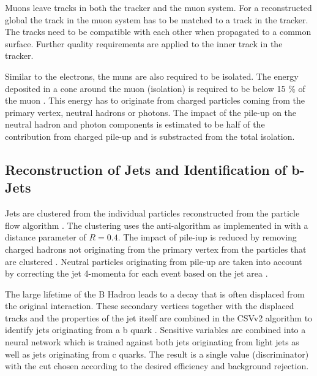 Muons leave tracks in both the tracker and the muon system. For a reconstructed global the track in the muon system has to be matched to a track in the tracker.
The tracks need to be compatible with each other when propagated to a common surface.
Further quality requirements are applied to the inner track in the tracker.

Similar to the electrons, the muns are also required to be isolated. The energy deposited in a cone around the muon (isolation) is required to be below 15 \% of the muon \pt.
This energy has to originate from charged particles coming from the primary vertex, neutral hadrons or photons. The impact of the pile-up on the neutral hadron and photon components
is estimated to be half of the contribution from charged pile-up and is substracted from the total isolation.



\subsection{Reconstruction of Jets and Identification of b-Jets}

Jets are clustered from the individual particles reconstructed from the particle flow algorithm \cite{CMS-PAS-JME-16-003}.
The clustering uses the anti-\kt algorithm \cite{Cacciari:2008gp} as implemented in \FASTJET \cite{Cacciari:2011ma} with a distance parameter of $R = 0.4$.
The impact of pile-iup is reduced by removing charged hadrons not originating from the primary vertex from the particles that are clustered \cite{CMS-PAS-JME-14-001}.
Neutral particles originating from pile-up are taken into account by correcting the jet 4-momenta for each event based on the jet area \cite{1126-6708-2008-04-005,CACCIARI2008119}.

The large lifetime of the B Hadron leads to a decay that is often displaced from the original interaction.
These secondary vertices together with the displaced tracks and the properties of the jet itself are combined in the CSVv2 algorithm to identify jets originating from a b quark \cite{BTV16002}.
Sensitive variables are combined into a neural network which is trained against both jets originating from light jets as well as jets originating from c quarks.
The result is a single value (discriminator) with the cut chosen according to the desired efficiency and background rejection.